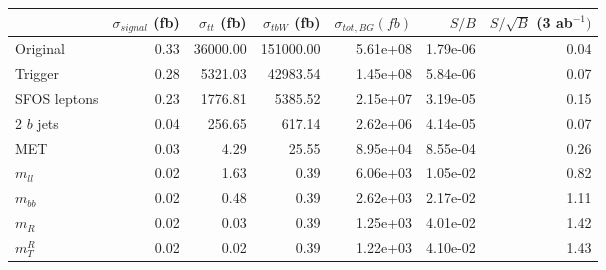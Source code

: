 \begin{tabular}{lrrrrrr}
\toprule
{} &  $\sigma_{signal}$ (fb) &  $\sigma_{tt}$ (fb) &  $\sigma_{tbW}$ (fb) &  $\sigma_{tot, BG} (fb)$ &     $S/B$ &  $S/\sqrt{B}$ (3 ab$^{-1})$ \\
\midrule
Original     &                    0.33 &            36000.00 &            151000.00 &                 5.61e+08 &  1.79e-06 &                        0.04 \\
Trigger      &                    0.28 &             5321.03 &             42983.54 &                 1.45e+08 &  5.84e-06 &                        0.07 \\
SFOS leptons &                    0.23 &             1776.81 &              5385.52 &                 2.15e+07 &  3.19e-05 &                        0.15 \\
2 $b$ jets   &                    0.04 &              256.65 &               617.14 &                 2.62e+06 &  4.14e-05 &                        0.07 \\
MET          &                    0.03 &                4.29 &                25.55 &                 8.95e+04 &  8.55e-04 &                        0.26 \\
$m_{ll}$     &                    0.02 &                1.63 &                 0.39 &                 6.06e+03 &  1.05e-02 &                        0.82 \\
$m_{bb}$     &                    0.02 &                0.48 &                 0.39 &                 2.62e+03 &  2.17e-02 &                        1.11 \\
$m_{R}$      &                    0.02 &                0.03 &                 0.39 &                 1.25e+03 &  4.01e-02 &                        1.42 \\
$m_{T}^{R}$  &                    0.02 &                0.02 &                 0.39 &                 1.22e+03 &  4.10e-02 &                        1.43 \\
\bottomrule
\end{tabular}
